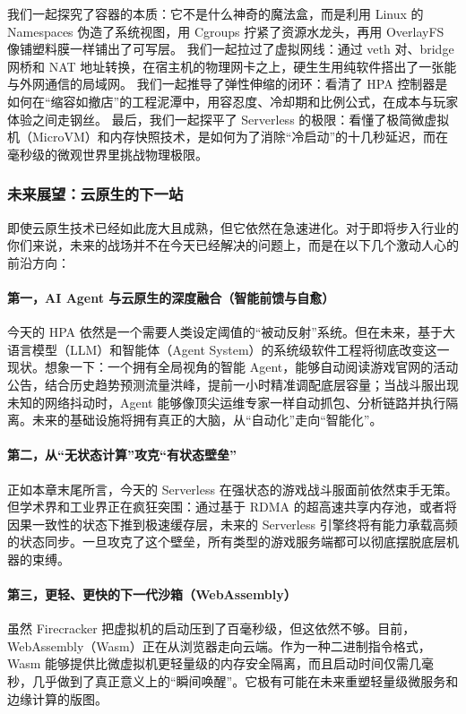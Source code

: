 我们一起探究了容器的本质：它不是什么神奇的魔法盒，而是利用 Linux 的 Namespaces 伪造了系统视图，用 Cgroups 拧紧了资源水龙头，再用 OverlayFS 像铺塑料膜一样铺出了可写层。
我们一起拉过了虚拟网线：通过 veth 对、bridge 网桥和 NAT 地址转换，在宿主机的物理网卡之上，硬生生用纯软件搭出了一张能与外网通信的局域网。
我们一起推导了弹性伸缩的闭环：看清了 HPA 控制器是如何在“缩容如撤店”的工程泥潭中，用容忍度、冷却期和比例公式，在成本与玩家体验之间走钢丝。
最后，我们一起探平了 Serverless 的极限：看懂了极简微虚拟机（MicroVM）和内存快照技术，是如何为了消除“冷启动”的十几秒延迟，而在毫秒级的微观世界里挑战物理极限。

\subsubsection{未来展望：云原生的下一站}

即使云原生技术已经如此庞大且成熟，但它依然在急速进化。对于即将步入行业的你们来说，未来的战场并不在今天已经解决的问题上，而是在以下几个激动人心的前沿方向：

\paragraph{第一，AI Agent 与云原生的深度融合（智能前馈与自愈）}
今天的 HPA 依然是一个需要人类设定阈值的“被动反射”系统。但在未来，基于大语言模型（LLM）和智能体（Agent System）的系统级软件工程将彻底改变这一现状。想象一下：一个拥有全局视角的智能 Agent，能够自动阅读游戏官网的活动公告，结合历史趋势预测流量洪峰，提前一小时精准调配底层容量；当战斗服出现未知的网络抖动时，Agent 能够像顶尖运维专家一样自动抓包、分析链路并执行隔离。未来的基础设施将拥有真正的大脑，从“自动化”走向“智能化”。

\paragraph{第二，从“无状态计算”攻克“有状态壁垒”}
正如本章末尾所言，今天的 Serverless 在强状态的游戏战斗服面前依然束手无策。但学术界和工业界正在疯狂突围：通过基于 RDMA 的超高速共享内存池，或者将因果一致性的状态下推到极速缓存层，未来的 Serverless 引擎终将有能力承载高频的状态同步。一旦攻克了这个壁垒，所有类型的游戏服务端都可以彻底摆脱底层机器的束缚。

\paragraph{第三，更轻、更快的下一代沙箱（WebAssembly）}
虽然 Firecracker 把虚拟机的启动压到了百毫秒级，但这依然不够。目前，WebAssembly（Wasm）正在从浏览器走向云端。作为一种二进制指令格式，Wasm 能够提供比微虚拟机更轻量级的内存安全隔离，而且启动时间仅需几毫秒，几乎做到了真正意义上的“瞬间唤醒”。它极有可能在未来重塑轻量级微服务和边缘计算的版图。

